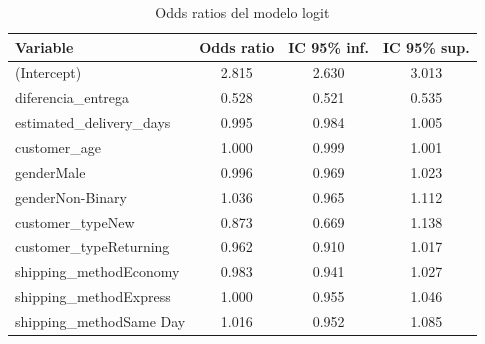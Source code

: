 \begin{table}[htbp]
\centering
\caption{Odds ratios del modelo logit}
\label{tab:logitor}
\begin{tabular}{lccc}
\toprule
Variable & Odds ratio & IC 95\% inf. & IC 95\% sup. \\
\midrule
(Intercept) & 2.815 & 2.630 & 3.013 \\
diferencia\_entrega & 0.528 & 0.521 & 0.535 \\
estimated\_delivery\_days & 0.995 & 0.984 & 1.005 \\
customer\_age & 1.000 & 0.999 & 1.001 \\
genderMale & 0.996 & 0.969 & 1.023 \\
genderNon-Binary & 1.036 & 0.965 & 1.112 \\
customer\_typeNew & 0.873 & 0.669 & 1.138 \\
customer\_typeReturning & 0.962 & 0.910 & 1.017 \\
shipping\_methodEconomy & 0.983 & 0.941 & 1.027 \\
shipping\_methodExpress & 1.000 & 0.955 & 1.046 \\
shipping\_methodSame Day & 1.016 & 0.952 & 1.085 \\
\bottomrule
\end{tabular}
\end{table}
